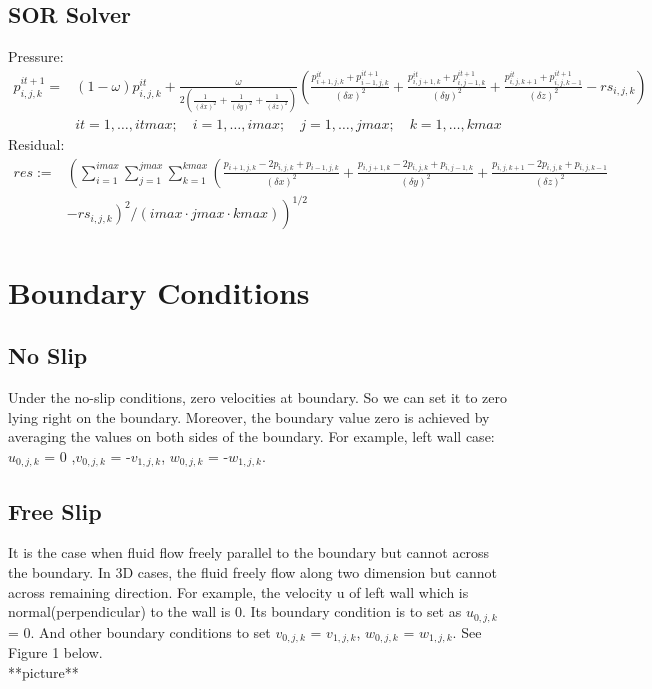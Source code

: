 \documentclass{article}%
\begin{document}
\subsection{SOR Solver}
Pressure:\\
\begin{equation}
\begin{split}
p^{it+1}_{i,j,k} = & (1 - \omega) p^{it}_{i,j,k} + \frac{\omega}{2 (\frac{1}{(\delta x)^2} + \frac{1}{(\delta y)^2} + \frac{1}{(\delta z)^2})} \left( \frac{p^{it}_{i+1,j,k} + p^{it+1}_{i-1,j,k}}{(\delta x)^2} + \frac{p^{it}_{i,j+1,k} + p^{it+1}_{i,j-1,k}}{(\delta y)^2} + \frac{p^{it}_{i,j,k+1} + p^{it+1}_{i,j,k-1}}{(\delta z)^2} - rs_{i,j,k} \right)\\
& it = 1,\ldots,itmax; \quad i = 1,\ldots,imax; \quad j = 1,\ldots,jmax; \quad k = 1,\ldots,kmax
\end{split}
\end{equation}
Residual:\\
\begin{equation}
\begin{split}
res := & \left( \sum_{i=1}^{imax} \sum_{j=1}^{jmax} \sum_{k=1}^{kmax} \left( \frac{p_{i+1,j,k} - 2 p_{i,j,k} + p_{i-1,j,k}}{(\delta x)^2} + \frac{p_{i,j+1,k} - 2 p_{i,j,k} + p_{i,j-1,k}}{(\delta y)^2} + \frac{p_{i,j,k+1} - 2 p_{i,j,k} + p_{i,j,k-1}}{(\delta z)^2} \right. \right. \\
& \left. \left. - rs_{i,j,k} \right)^2 / (imax \cdot jmax \cdot kmax) \right)^{1/2}
\end{split}
\end{equation}
\section{Boundary Conditions}
\subsection{No Slip} 
Under the no-slip conditions, zero velocities at boundary. So we can set it to zero lying right on the boundary. Moreover, the boundary value zero is achieved by averaging the values on both sides of the boundary. For example, left wall case: $u_{0,j,k}$ = 0 ,$v_{0,j,k}$ = -$v_{1,j,k}$, $w_{0,j,k}$ = -$w_{1,j,k}$.
\subsection{Free Slip} 
It is the case when fluid flow freely parallel to the boundary but cannot across the boundary. In 3D cases, the fluid freely flow along two dimension but cannot across remaining direction. For example, the velocity u of left wall which is normal(perpendicular) to the wall is 0. Its boundary condition is to set as $u_{0,j,k}$ = 0. And other boundary conditions to set $v_{0,j,k}$ = $v_{1,j,k}$, $w_{0,j,k}$ = $w_{1,j,k}$. See Figure 1 below.
\\
**picture**
\\
\end{document}
